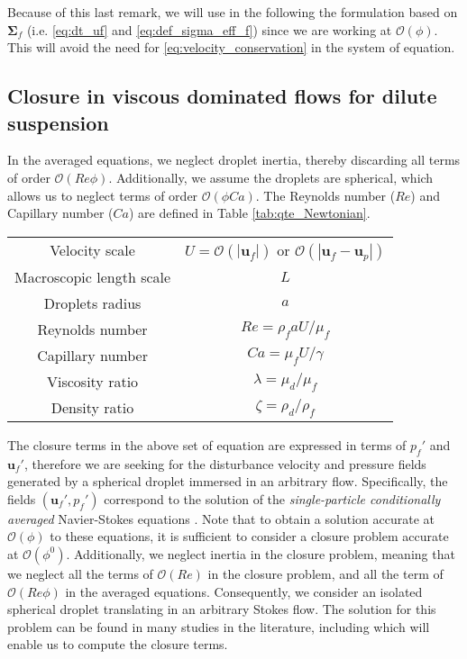 Because of this last remark, we will use in the following the formulation based on $\bm\Sigma_f$ (i.e. \ref{eq:dt_uf} and \ref{eq:def_sigma_eff_f}) since we are working at $\mathcal{O}(\phi)$.
This will avoid the need for \ref{eq:velocity_conservation} in the system of equation. 



\subsection{Closure in viscous dominated flows for dilute suspension}
In the averaged equations, we neglect droplet inertia, thereby discarding all terms of order $\mathcal{O}(Re \phi)$. 
Additionally, we assume the droplets are spherical, which allows us to neglect terms of order $\mathcal{O}(\phi Ca)$. 
The Reynolds number ($Re$) and Capillary number ($Ca$) are defined in Table \ref{tab:qte_Newtonian}.
\begin{table}
\begin{tabular}{|c|c|}\hline\hline
    Velocity scale & $U = \mathcal{O}(|\textbf{u}_f|)$ or $\mathcal{O}(|\textbf{u}_f - \textbf{u}_p|)$ \\
    Macroscopic length scale & $L$ \\
    Droplets radius & $a$ \\
    Reynolds number & $Re = \rho_f a U / \mu_f$   \\
Capillary number & $Ca = \mu_f U / \gamma$ \\\hline
Viscosity ratio & $\lambda = \mu_d / \mu_f$ \\
Density ratio & $\zeta = \rho_d / \rho_f$ \\
    \end{tabular}
\end{table}

The closure terms in the above set of equation are expressed in terms of $p_f'$ and $\textbf{u}_f'$, therefore we are seeking for the disturbance velocity and pressure fields generated by a spherical droplet immersed in an arbitrary flow. 
Specifically, the fields $(\textbf{u}_f',p_f')$ correspond to the solution of the 
 \textit{single-particle conditionally averaged} Navier-Stokes equations \citep{hinch1977averaged,zhang1994averaged} . 
Note that to obtain a solution accurate at $\mathcal{O}(\phi)$ to these equations, it is sufficient to consider a closure problem accurate at $\mathcal{O}(\phi^0)$\citep{hinch1977averaged,zhang1994averaged}.
Additionally, we neglect inertia in the closure problem, meaning that we neglect all the terms of $\mathcal{O}(Re)$ in the closure problem, and all the term of $\mathcal{O}(Re\phi)$ in the averaged equations. 
Consequently, we consider an isolated spherical droplet translating in an arbitrary Stokes flow.
The solution for this problem can be found in many studies in the literature, including \citet{leal2007advanced,pozrikidis1992boundary,kim2013microhydrodynamics,pozrikidis2011introduction,nadim1991motion} which will enable us to compute the closure terms.

